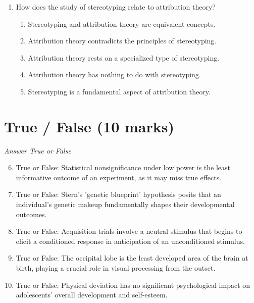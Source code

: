 \documentclass[12pt]{article}
\begin{document}
\begin{enumerate}[label=\arabic*.]
and continuous, which of the following correlation procedures is most appropriate
\begin{enumerate}[label=(\alph*)]
    \item Kendal's tau
    \item Biserial correlation
    \item Cramer's V
    \item Eta
    \item Goodman and Kruskal's gamma
\end{enumerate}
\item How does the study of stereotyping relate to attribution theory?
\begin{enumerate}[label=(\alph*)]
    \item Stereotyping and attribution theory are equivalent concepts.
    \item Attribution theory contradicts the principles of stereotyping.
    \item Attribution theory rests on a specialized type of stereotyping.
    \item Attribution theory has nothing to do with stereotyping.
    \item Stereotyping is a fundamental aspect of attribution theory.
\end{enumerate}
\end{enumerate}

\section*{True / False (10 marks)}
\textit{Answer True or False}
\begin{enumerate}[label=\arabic*.]
\setcounter{enumi}{5}
\item True or False: Statistical nonsignificance under low power is the least informative outcome of an experiment, as it may miss true effects.
\item True or False: Stern's 'genetic blueprint' hypothesis posits that an individual's genetic makeup fundamentally shapes their developmental outcomes.
\item True or False: Acquisition trials involve a neutral stimulus that begins to elicit a conditioned response in anticipation of an unconditioned stimulus.
\item True or False: The occipital lobe is the least developed area of the brain at birth, playing a crucial role in visual processing from the outset.
\item True or False: Physical deviation has no significant psychological impact on adolescents' overall development and self-esteem.
\end{enumerate}
\end{document}
